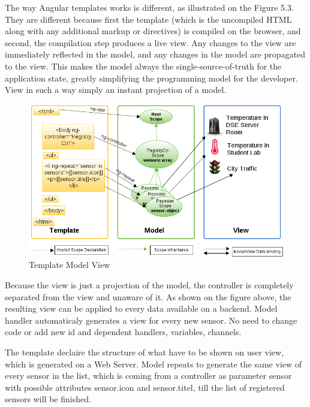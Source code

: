 	The way Angular templates works is different, as illustrated on the Figure 5.3. They are different because first the template (which is the uncompiled HTML along with any additional markup or directives) is compiled on the browser, and second, the compilation step produces a live view. Any changes to the view are immediately reflected in the model, and any changes in the model are propagated to the view. This makes the model always the single-source-of-truth for the application state, greatly simplifying the programming model for the developer. View in such a way simply an instant projection of a model.
	    \begin{figure}[!ht]
		\centering
		\includegraphics[scale=0.6]{images/3wayBinding.png}   
		\caption[Template Model View]{Template Model View}                         
		\end{figure}
        
    Because the view is just a projection of the model, the controller is completely separated from the view and unaware of it. As shown on the figure above, the resulting view can be applied to every data available on a backend. Model handler automaticaly generates a view for every new sensor. No need to change code or add new id and dependent handlers, variables, channels. 
    
    The template declaire the structure of what have to be shown on user view, which is generated on a Web Server. Model repeats to generate the same view of every sensor in the list, which is coming from a controller as parameter {{sensor}} with possible attributes {{sensor.icon}} and {{sensor.titel}}, till the list of registered sensors will be finished.

